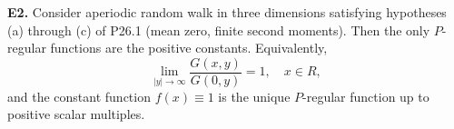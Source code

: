 \textbf{E2.} Consider aperiodic random walk in three dimensions satisfying hypotheses (a) through (c) of P26.1 (mean zero, finite second moments). Then the only $P$-regular functions are the positive constants. Equivalently,
$$\lim_{|y| \to \infty} \frac{G(x,y)}{G(0,y)} = 1, \quad x \in R,$$
and the constant function $f(x) \equiv 1$ is the unique $P$-regular function up to positive scalar multiples.
